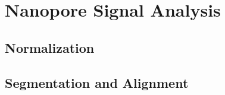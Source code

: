 \chapter{Nanopore Signal Analysis}
\label{sec:signal}

\section{Normalization}
\label{sec:signal:normalization}

\section{Segmentation and Alignment}
\label{sec:signal:alignment}

